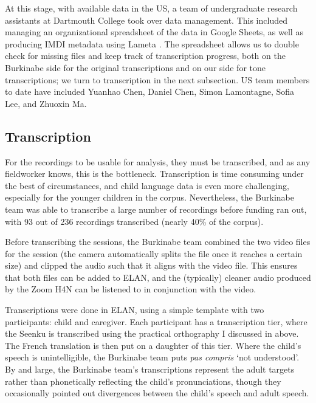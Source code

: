 \documentclass[output=paper,colorlinks,citecolor=brown,
]{langscibook}
\begin{document}
At this stage, with available data in the US, a team of undergraduate research assistants at Dartmouth College took over data management. This included managing an organizational spreadsheet of the data in Google Sheets, as well as producing IMDI metadata using Lameta \citep{Lameta}. The spreadsheet allows us to double check for missing files and keep track of transcription progress, both on the Burkinabe side for the original transcriptions and on our side for tone transcriptions; we turn to transcription in the next subsection. US team members to date have included Yuanhao Chen, Daniel Chen, Simon Lamontagne, Sofia Lee, and Zhuoxin Ma. 


\subsection{Transcription}

For the recordings to be usable for analysis, they must be transcribed, and as any fieldworker knows, this is the bottleneck. Transcription is time consuming under the best of circumstances, and child language data is even more challenging, especially for the younger children in the corpus. Nevertheless, the Burkinabe team was able to transcribe a large number of recordings before funding ran out, with 93 out of 236 recordings transcribed (nearly 40\% of the corpus). 

Before transcribing the sessions, the Burkinabe team combined the two video files for the session (the camera automatically splits the file once it reaches a certain size) and clipped the audio such that it aligns with the video file. This ensures that both files can be added to ELAN, and the (typically) cleaner audio produced by the Zoom H4N can be listened to in conjunction with the video. 

Transcriptions were done in ELAN, using a simple template with two participants: child and caregiver. Each participant has a transcription tier, where the Seenku is transcribed using the practical orthography I discussed in  above. The French translation is then put on a daughter of this tier. Where the child's speech is unintelligible, the Burkinabe team puts \textit{pas compris} `not understood'. By and large, the Burkinabe team's transcriptions represent the adult targets rather than phonetically reflecting the child's pronunciations, though they occasionally pointed out divergences between the child's speech and adult speech. 
\end{document}
